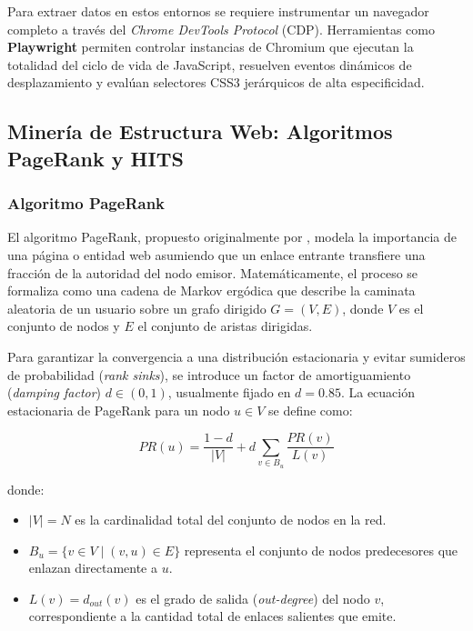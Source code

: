 Para extraer datos en estos entornos se requiere instrumentar un navegador completo a través del \textit{Chrome DevTools Protocol} (CDP). Herramientas como \textbf{Playwright} \citep{playwright2024} permiten controlar instancias de Chromium que ejecutan la totalidad del ciclo de vida de JavaScript, resuelven eventos dinámicos de desplazamiento y evalúan selectores CSS3 jerárquicos de alta especificidad.

\subsection{Minería de Estructura Web: Algoritmos PageRank y HITS}

\subsubsection{Algoritmo PageRank}
El algoritmo PageRank, propuesto originalmente por \citet{page1998anatomy}, modela la importancia de una página o entidad web asumiendo que un enlace entrante transfiere una fracción de la autoridad del nodo emisor. Matemáticamente, el proceso se formaliza como una cadena de Markov ergódica que describe la caminata aleatoria de un usuario sobre un grafo dirigido $G = (V, E)$, donde $V$ es el conjunto de nodos y $E$ el conjunto de aristas dirigidas.

Para garantizar la convergencia a una distribución estacionaria y evitar sumideros de probabilidad (\textit{rank sinks}), se introduce un factor de amortiguamiento (\textit{damping factor}) $d \in (0, 1)$, usualmente fijado en $d = 0.85$. La ecuación estacionaria de PageRank para un nodo $u \in V$ se define como:

\begin{equation}
    PR(u) = \frac{1 - d}{|V|} + d \sum_{v \in B_u} \frac{PR(v)}{L(v)}
    \label{eq:pagerank}
\end{equation}

\noindent donde:
\begin{itemize}[leftmargin=*]
    \item $|V| = N$ es la cardinalidad total del conjunto de nodos en la red.
    \item $B_u = \{v \in V \mid (v, u) \in E\}$ representa el conjunto de nodos predecesores que enlazan directamente a $u$.
    \item $L(v) = d_{out}(v)$ es el grado de salida (\textit{out-degree}) del nodo $v$, correspondiente a la cantidad total de enlaces salientes que emite.
\end{itemize}

